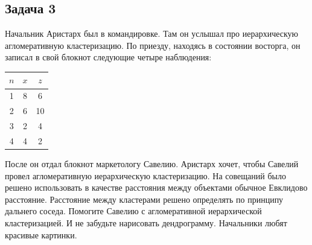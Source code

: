 \documentclass[12pt, a4paper, oneside]{article}
\begin{document}
\subsection*{Задача 3 }

Начальник Аристарх был в командировке. Там он услышал про иерархическую агломеративную кластеризацию. По приезду, находясь в состоянии восторга, он записал в свой блокнот следующие четыре наблюдения:

\begin{center}
\begin{tabular}{c|c|c}
	\hline
	$n$  & $x$ & $z$ \\
	\hline
	1 & 8 & 6   \\
	2 & 6 & 10 \\
	3 & 2 & 4   \\
	4 & 4 & 2   \\
\end{tabular}
\end{center}

После он отдал блокнот маркетологу Савелию. Аристарх хочет, чтобы Савелий провел агломеративную иерархическую кластеризацию.  На совещаний было решено использовать в качестве расстояния между объектами обычное Евклидово расстояние. Расстояние между кластерами решено определять по принципу дальнего соседа. Помогите Савелию с агломеративной иерархической кластеризацией. И не забудьте нарисовать дендрограмму. Начальники любят красивые картинки. 
\end{document}
